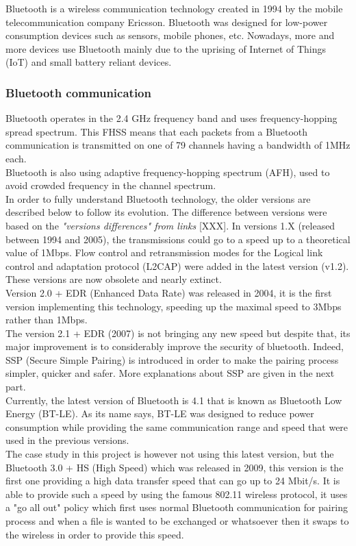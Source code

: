 Bluetooth is a wireless communication technology created in 1994 by the mobile telecommunication company Ericsson. Bluetooth was designed for low-power consumption devices such as sensors, mobile phones, etc. Nowadays, more and more devices use Bluetooth mainly due to the uprising of Internet of Things (IoT) and small battery reliant devices.

\subsubsection{Bluetooth communication}
Bluetooth operates in the 2.4 GHz frequency band and uses frequency-hopping spread spectrum. This FHSS means that each packets from a Bluetooth communication is transmitted on one of 79 channels having a bandwidth of 1MHz each.\\
Bluetooth is also using adaptive frequency-hopping spectrum (AFH), used to avoid crowded frequency in the channel spectrum.\\

In order to fully understand Bluetooth technology, the older versions are described below to follow its evolution. The difference between versions were based on the \textit{"versions differences" from links} [XXX].
In versions 1.X (released between 1994 and 2005), the transmissions could go to a speed up to a theoretical value of 1Mbps. Flow control and retransmission modes for the Logical link control and adaptation protocol (L2CAP) were added in the latest version (v1.2). These versions are now obsolete and nearly extinct.\\
Version 2.0 + EDR (Enhanced Data Rate) was released in 2004, it is the first version implementing this technology, speeding up the maximal speed to 3Mbps rather than 1Mbps.\\
The version 2.1 + EDR (2007) is not bringing any new speed but despite that, its major improvement is to considerably improve the security of bluetooth. Indeed, SSP (Secure Simple Pairing) is introduced in order to make the pairing process simpler, quicker and safer. More explanations about SSP are given in the next part.\\
Currently, the latest version of Bluetooth is 4.1 that is known as Bluetooth Low Energy (BT-LE). As its name says, BT-LE was designed to reduce power consumption while providing the same communication range and speed that were used in the previous versions. \\
The case study in this project is however not using this latest version, but the Bluetooth 3.0 + HS (High Speed) which was released in 2009, this version is  the first one providing a high data transfer speed that can go up to 24 Mbit/s. It is able to provide such a speed by using the famous 802.11 wireless protocol, it uses a "go all out" policy which first uses normal Bluetooth communication for pairing process and when a file is wanted to be exchanged or whatsoever then it swaps to the wireless in order to provide this speed.\\

